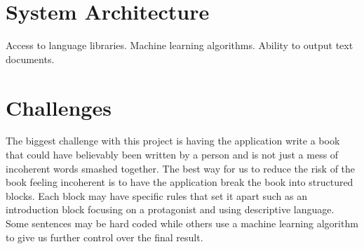 \documentclass[12pt]{article}
\begin{document}
\newpage

\section{System Architecture}

Access to language libraries.
\newline
Machine learning algorithms.
\newline
Ability to output text documents.

\section{Challenges}

The biggest challenge with this project is having the application write a book that could have believably been written by a person and is not just a mess of incoherent words smashed together. 
\newline
\newline
The best way for us to reduce the risk of the book feeling incoherent is to have the application break the book into structured blocks. Each block may have specific rules that set it apart such as an introduction block focusing on a protagonist and using descriptive language. Some sentences may be hard coded while others use a machine learning algorithm to give us further control over the final result.



\end{document}
